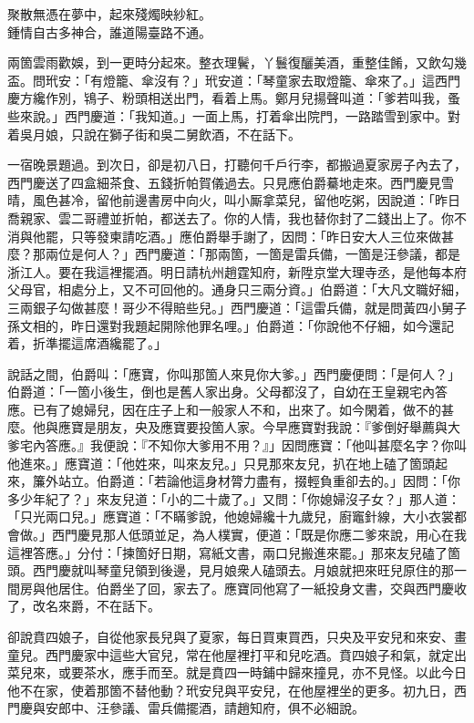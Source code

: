 \begin{myquote} 
聚散無憑在夢中，起來殘燭映紗紅。\\鍾情自古多神合，誰道陽臺路不通。
\end{myquote} 

兩箇雲雨歡娛，到一更時分起來。整衣理鬢，丫鬟復釃美酒，重整佳餚，又飲勾幾盃。問玳安：「有燈籠、傘沒有？」玳安道：「琴童家去取燈籠、傘來了。」這西門慶方纔作別，鴇子、粉頭相送出門，看着上馬。鄭月兒揚聲叫道：「爹若叫我，蚤些來說。」西門慶道：「我知道。」一面上馬，打着傘出院門，一路踏雪到家中。對着吳月娘，只說在獅子街和吳二舅飲酒，不在話下。

一宿晚景題過。到次日，卻是初八日，打聽何千戶行李，都搬過夏家房子內去了，西門慶送了四盒細茶食、五錢折帕賀儀過去。只見應伯爵驀地走來。西門慶見雪晴，風色甚冷，留他前邊書房中向火，叫小厮拿菜兒，留他吃粥，因說道：「昨日喬親家、雲二哥禮並折帕，都送去了。你的人情，我也替你封了二錢出上了。你不消與他罷，只等發柬請吃酒。」應伯爵舉手謝了，因問：「昨日安大人三位來做甚麼？那兩位是何人？」西門慶道：「那兩箇，一箇是雷兵備，一箇是汪參議，都是浙江人。要在我這裡擺酒。明日請杭州趙霆知府，新陞京堂大理寺丞，是他每本府父母官，相處分上，又不可回他的。通身只三兩分資。」伯爵道：「大凡文職好細，三兩銀子勾做甚麼！哥少不得賠些兒。」西門慶道：「這雷兵備，就是問黃四小舅子孫文相的，昨日還對我題起開除他罪名哩。」伯爵道：「你說他不仔細，如今還記着，折準擺這席酒纔罷了。」{}

說話之間，伯爵叫：「應寶，你叫那箇人來見你大爹。」西門慶便問：「是何人？」伯爵道：「一箇小後生，倒也是舊人家出身。父母都沒了，自幼在王皇親宅內答應。已有了媳婦兒，因在庄子上和一般家人不和，出來了。如今閑着，做不的甚麼。他與應寶是朋友，央及應寶要投箇人家。今早應寶對我說：『爹倒好舉薦與大爹宅內答應。』我便說：『不知你大爹用不用？』」因問應寶：「他叫甚麼名字？你叫他進來。」應寶道：「他姓來，叫來友兒。」只見那來友兒，扒在地上磕了箇頭起來，簾外站立。伯爵道：「若論他這身材膂力盡有，掇輕負重卻去的。」因問：「你多少年紀了？」來友兒道：「小的二十歲了。」又問：「你媳婦沒子女？」那人道：「只光兩口兒。」應寶道：「不瞞爹說，他媳婦纔十九歲兒，廚竈針線，大小衣裳都會做。」西門慶見那人低頭並足，為人樸實，便道：「既是你應二爹來說，用心在我這裡答應。」分付：「揀箇好日期，寫紙文書，兩口兒搬進來罷。」那來友兒磕了箇頭。西門慶就叫琴童兒領到後邊，見月娘衆人磕頭去。月娘就把來旺兒原住的那一間房與他居住。伯爵坐了回，家去了。應寶同他寫了一紙投身文書，交與西門慶收了，改名來爵，不在話下。

卻說賁四娘子，自從他家長兒與了夏家，每日買東買西，只央及平安兒和來安、畫童兒。西門慶家中這些大官兒，常在他屋裡打平和兒吃酒。賁四娘子和氣，就定出菜兒來，或要茶水，應手而至。就是賁四一時鋪中歸來撞見，亦不見怪。以此今日他不在家，使着那箇不替他動？玳安兒與平安兒，在他屋裡坐的更多。初九日，西門慶與安郎中、汪參議、雷兵備擺酒，請趙知府，俱不必細說。

